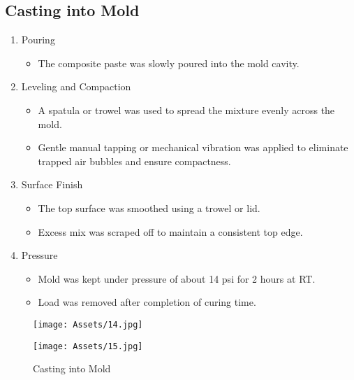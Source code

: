 \subsection{Casting into Mold  }
\begin{enumerate}
    \item  Pouring
    \begin{itemize}
        \item The composite paste was slowly poured into the mold cavity.
    \end{itemize}
    \item  Leveling and Compaction 
    \begin{itemize}
        \item A spatula or trowel was used to spread the mixture evenly across the mold.  
        \item Gentle manual tapping or mechanical vibration was applied to eliminate trapped air bubbles and ensure compactness. 
    \end{itemize}
    \item Surface Finish 
    \begin{itemize}
        \item The top surface was smoothed using a trowel or lid. 
        \item Excess mix was scraped off to maintain a consistent top edge. 
    \end{itemize}
    \item Pressure
    \begin{itemize}
        \item Mold was kept under pressure of about 14 psi for 2 hours at RT. 
        \item Load was removed after completion of curing time. 
    \end{itemize}
\end{enumerate}

\begin{figure}[H]
    \centering
    \begin{minipage}{0.48\textwidth}
    \centering
    \texttt{[image: Assets/14.jpg]}
    \end{minipage}
    \hfill
    \begin{minipage}{0.48\textwidth}
    \centering
    \texttt{[image: Assets/15.jpg]}
    \end{minipage}
    \caption{Casting into Mold  }
\end{figure}

